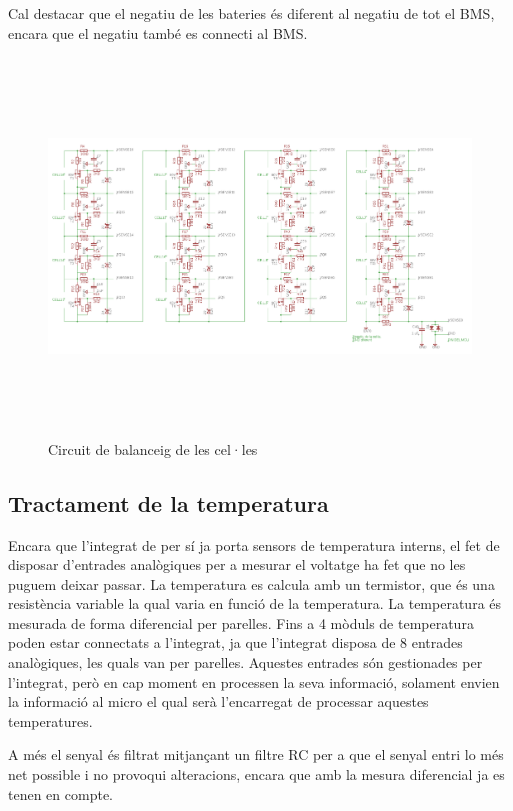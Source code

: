 Cal destacar que el negatiu de les bateries és diferent al negatiu de tot el BMS, encara que el negatiu també es connecti al BMS.

\begin{figure}[H]
	\centering
    \includegraphics[width=\textwidth, height=10cm] {Prototip/schbalancing.png}
    \caption{Circuit de balanceig de les cel·les}
\end{figure}

\subsection{Tractament de la temperatura}
Encara que l'integrat de per sí ja porta sensors de temperatura interns, el fet de disposar d'entrades analògiques per a mesurar el voltatge ha fet que no les puguem deixar passar. La temperatura es calcula amb un termistor, que és una resistència variable la qual varia en funció de la temperatura. La temperatura és mesurada de forma diferencial per parelles. Fins a 4 mòduls de temperatura poden estar connectats a l'integrat, ja que l'integrat disposa de 8 entrades analògiques, les quals van per parelles. Aquestes entrades són gestionades per l'integrat, però en cap moment en processen la seva informació, solament envien la informació al micro el qual serà l'encarregat de processar aquestes temperatures.

A més el senyal és filtrat mitjançant un filtre RC per a que el senyal entri lo més net possible i no provoqui alteracions, encara que amb la mesura diferencial ja es tenen en compte.

